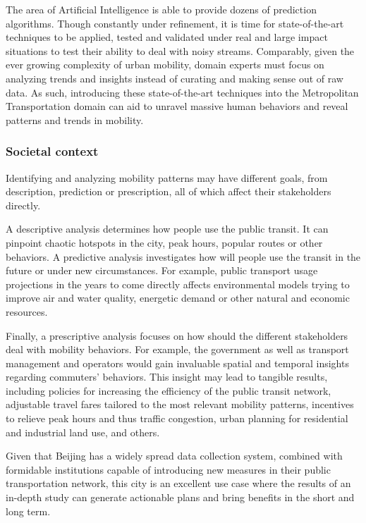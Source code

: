 \documentclass{article}
\begin{document}
The area of Artificial Intelligence is able to provide dozens of prediction algorithms. Though constantly under refinement, it is time for state-of-the-art techniques to be applied, tested and validated under real and large impact situations to test their ability to deal with noisy streams. Comparably, given the ever growing complexity of urban mobility, domain experts must focus on analyzing trends and insights instead of curating and making sense out of raw data. As such, introducing these state-of-the-art techniques into the Metropolitan Transportation domain can aid to unravel massive human behaviors and reveal patterns and trends in mobility.

\subsubsection{Societal context}
Identifying and analyzing mobility patterns may have different goals, from description, prediction or prescription, all of which affect their stakeholders directly. 

A descriptive analysis determines how people use the public transit. It can pinpoint chaotic hotspots in the city, peak hours, popular routes or other behaviors. A predictive analysis investigates how will people use the transit in the future or under new circumstances. For example, public transport usage projections in the years to come directly affects environmental models trying to improve air and water quality, energetic demand or other natural  and economic resources.

Finally, a prescriptive analysis focuses on how should the different stakeholders deal with mobility behaviors. For example, the government as well as transport management and operators would gain invaluable spatial and temporal insights regarding commuters' behaviors. This insight may lead to tangible results, including policies for increasing the efficiency of the public transit network, adjustable travel fares tailored to the most relevant mobility patterns, incentives to relieve peak hours and thus traffic congestion, urban planning for residential and industrial land use, and others.

Given that Beijing has a widely spread data collection system, combined with formidable institutions capable of introducing new measures in their public transportation network, this city is an excellent use case where the results of an in-depth study can generate actionable plans and bring benefits in the short and long term.
\end{document}
